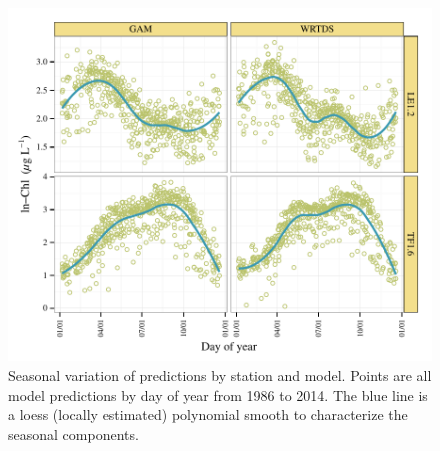 \documentclass[letterpaper,12pt,oneside]{article}\usepackage[]{graphicx}\usepackage[]{color}
\makeatletter
\def\maxwidth{ %
  \ifdim\Gin@nat@width>\linewidth
    \linewidth
  \else
    \Gin@nat@width
  \fi
}
\newenvironment{knitrout}{}{} %
\makeatother
\begin{document}
\begin{knitrout}
\color{fgcolor}\begin{figure}[!ht]

{\centering \includegraphics[width=\maxwidth]{figs/seas-1} 

}

\caption[Seasonal variation of predictions by station and model]{Seasonal variation of predictions by station and model.  Points are all model predictions by day of year from 1986 to 2014.  The blue line is a loess (locally estimated) polynomial smooth to characterize the seasonal components.}\label{fig:seas}
\end{figure}


\end{knitrout}
\end{document}
